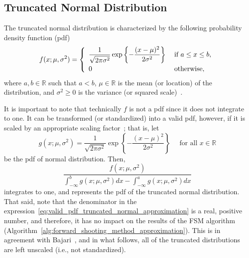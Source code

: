 \subsection{Truncated Normal Distribution} %
\label{sub:truncated_normal_distribution_approximation}
The truncated normal distribution is characterized by the following probability density function (pdf)
\begin{equation}
  \label{eq:pdf_truncated_normal_approximation}
  f(x; \mu, \sigma^2) = \left\{
  \begin{array}{l l}
    \displaystyle\frac{1}{\sqrt{2\pi\sigma^2}}\exp\left\{-\frac{(x-\mu)^2}{2\sigma^2}\right\} & \;\text{if } a\leq x\leq b,\\[2ex]
    0 & \;\text{otherwise},
  \end{array}\right.
\end{equation}
where $a,b\in\mathbb{R}$ such that $a < b$, $\mu\in\mathbb{R}$ is the mean (or location) of the distribution, and $\sigma^2\geq 0$ is the variance (or squared scale)~\cite{JohnsonNormal1994,Cohen1991}.

It is important to note that technically $f$ is not a pdf since it does not integrate to one. It can be transformed (or standardized) into a valid pdf, however, if it is scaled by an appropriate scaling factor~\cite{Cohen1991}; that is, let
\begin{equation*}
  g(x; \mu, \sigma^2) = \displaystyle\frac{1}{\sqrt{2\pi\sigma^2}}\exp\left\{-\frac{(x-\mu)^2}{2\sigma^2}\right\} \quad\text{ for all } x\in\mathbb{R}
\end{equation*}
be the pdf of normal distribution. Then,
\begin{equation}
  \label{eq:valid_pdf_truncated_normal_approximation}
  \displaystyle\frac{f(x;\mu, \sigma^2)}{\int_{-\infty}^b g(x;\mu,\sigma^2)dx - \int_{-\infty}^a g(x;\mu,\sigma^2)dx}
\end{equation}
integrates to one, and represents the pdf of the truncated normal distribution. That said, note that the denominator in the expression~\eqref{eq:valid_pdf_truncated_normal_approximation} is a real, positive number, and therefore, it has no impact on the results of the FSM algorithm (Algorithm~\ref{alg:forward_shooting_method_approximation}). This is in agreement with Bajari~\cite{Bajari2001a}, and in what follows, all of the truncated distributions are left unscaled (i.e., not standardized).

